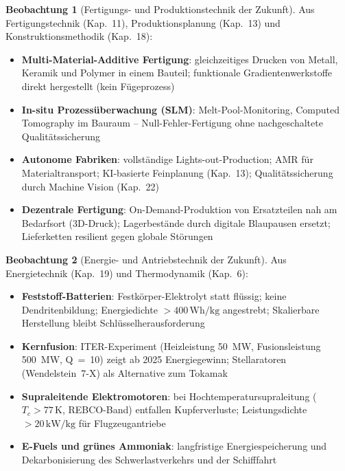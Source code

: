﻿\documentclass[a4paper,12pt]{report}
\theoremstyle{definition}
\newtheorem{beobachtung}{Beobachtung}
\begin{document}
\begin{beobachtung}[Fertigungs- und Produktionstechnik der Zukunft]
Aus Fertigungstechnik (Kap.~11), Produktionsplanung (Kap.~13) und
Konstruktionsmethodik (Kap.~18):
\begin{itemize}
    \item[-] \textbf{Multi-Material-Additive Fertigung}: gleichzeitiges Drucken
          von Metall, Keramik und Polymer in einem Bauteil; funktionale
          Gradientenwerkstoffe direkt hergestellt (kein Fügeprozess)
    \item[-] \textbf{In-situ Prozessüberwachung (SLM)}: Melt-Pool-Monitoring,
          Computed Tomography im Bauraum -- Null-Fehler-Fertigung ohne
          nachgeschaltete Qualitätssicherung
    \item[-] \textbf{Autonome Fabriken}: vollständige Lights-out-Production;
          AMR für Materialtransport; KI-basierte Feinplanung (Kap.~13);
          Qualitätssicherung durch Machine Vision (Kap.~22)
    \item[-] \textbf{Dezentrale Fertigung}: On-Demand-Produktion von Ersatzteilen
          nah am Bedarfsort (3D-Druck); Lagerbestände durch digitale Blaupausen ersetzt;
          Lieferketten resilient gegen globale Störungen
\end{itemize}
\end{beobachtung}

\begin{beobachtung}[Energie- und Antriebstechnik der Zukunft]
Aus Energietechnik (Kap.~19) und Thermodynamik (Kap.~6):
\begin{itemize}
    \item[-] \textbf{Feststoff-Batterien}: Festkörper-Elektrolyt statt flüssig;
          keine Dendritenbildung; Energiedichte $> 400\,\mathrm{Wh/kg}$ angestrebt;
          Skalierbare Herstellung bleibt Schlüsselherausforderung
    \item[-] \textbf{Kernfusion}: ITER-Experiment (Heizleistung 50~MW,
          Fusionsleistung 500~MW, Q~=~10) zeigt ab 2025 Energiegewinn;
          Stellaratoren (Wendelstein~7-X) als Alternative zum Tokamak
    \item[-] \textbf{Supraleitende Elektromotoren}: bei Hochtemperatursupraleitung
          ($T_c > 77\,\mathrm{K}$, REBCO-Band) entfallen Kupferverluste;
          Leistungsdichte $> 20\,\mathrm{kW/kg}$ für Flugzeugantriebe
    \item[-] \textbf{E-Fuels und grünes Ammoniak}: langfristige Energiespeicherung
          und Dekarbonisierung des Schwerlastverkehrs und der Schifffahrt
\end{itemize}
\end{beobachtung}
\end{document}
